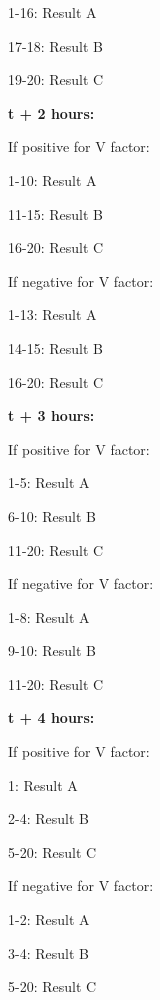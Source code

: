 \documentclass[green]{guildcamp4}
\begin{document}
1-16: Result A

17-18: Result B

19-20: Result C

{\bf t + 2 hours:}

If positive for V factor:

1-10: Result A

11-15: Result B

16-20: Result C

If negative for V factor:

1-13: Result A

14-15: Result B

16-20: Result C

{\bf t + 3 hours:}

If positive for V factor:

1-5: Result A

6-10: Result B

11-20: Result C

If negative for V factor:

1-8: Result A

9-10: Result B

11-20: Result C

{\bf t + 4 hours:}

If positive for V factor:

1: Result A

2-4: Result B

5-20: Result C

If negative for V factor:

1-2: Result A

3-4: Result B

5-20: Result C
\end{document}
